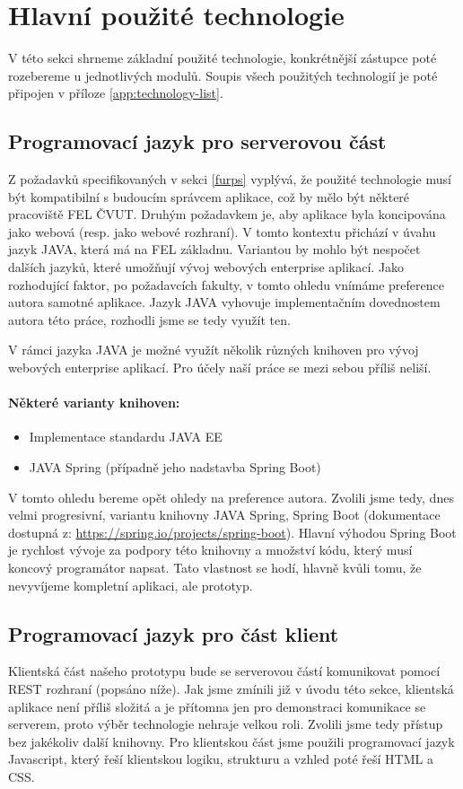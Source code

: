\section{Hlavní použité technologie}
V této sekci shrneme základní použité technologie, konkrétnější zástupce poté rozebereme u jednotlivých modulů. Soupis všech použitých technologií je poté připojen v příloze \ref{app:technology-list}.
\subsection{Programovací jazyk pro serverovou část}
Z požadavků specifikovaných v sekci \ref{furps} vyplývá, že použité technologie musí být kompatibilní s budoucím správcem aplikace, což by mělo být některé pracoviště FEL ČVUT. Druhým požadavkem je, aby aplikace byla koncipována jako webová (resp. jako webové rozhraní). V tomto kontextu přichází v úvahu jazyk JAVA, která má na FEL základnu. Variantou by mohlo být nespočet dalších jazyků, které umožňují vývoj webových enterprise aplikací. Jako rozhodující faktor, po požadavcích fakulty, v tomto ohledu vnímáme preference autora samotné aplikace. Jazyk JAVA vyhovuje implementačním dovednostem autora této práce, rozhodli jsme se tedy využít ten. \par
V rámci jazyka JAVA je možné využít několik různých knihoven pro vývoj webových enterprise aplikací. Pro účely naší práce se mezi sebou příliš neliší.
\paragraph{Některé varianty knihoven:}
\begin{itemize}
    \item Implementace standardu JAVA EE
    \item JAVA Spring (případně jeho nadstavba Spring Boot)
\end{itemize}
V tomto ohledu bereme opět ohledy na preference autora. Zvolili jsme tedy, dnes velmi progresivní, variantu knihovny JAVA Spring, Spring Boot (dokumentace dostupná z: \url{https://spring.io/projects/spring-boot}). Hlavní výhodou Spring Boot je rychlost vývoje za podpory této knihovny a množství kódu, který musí koncový programátor napsat. Tato vlastnost se hodí, hlavně kvůli tomu, že nevyvíjeme kompletní aplikaci, ale prototyp.
\subsection{Programovací jazyk pro část klient}
Klientská část našeho prototypu bude se serverovou částí komunikovat pomocí REST rozhraní (popsáno níže). Jak jsme zmínili již v úvodu této sekce, klientská aplikace není příliš složitá a je přítomna jen pro demonstraci komunikace se serverem, proto výběr technologie nehraje velkou roli. Zvolili jsme tedy přístup bez jakékoliv další knihovny. Pro klientskou část jsme použili programovací jazyk Javascript, který řeší klientskou logiku, strukturu a vzhled poté řeší HTML a CSS.
